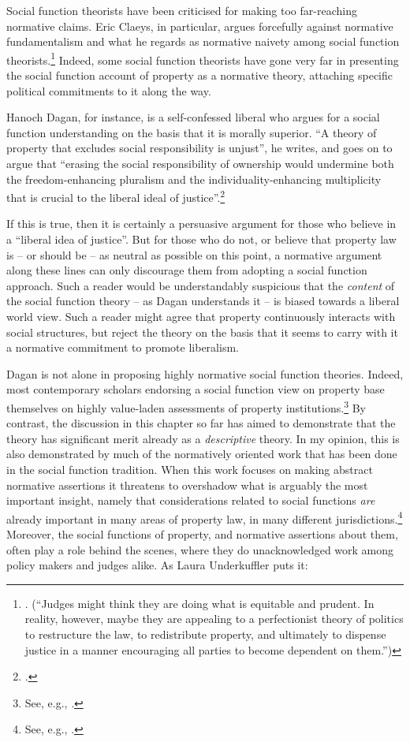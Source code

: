 Social function theorists have been criticised for making too far-reaching normative claims. Eric Claeys, in particular, argues forcefully against normative fundamentalism and what he regards as normative naivety among social function theorists.\footnote{\cite[945]{claeys09}. (``Judges might think they are doing what is equitable and prudent. In reality, however, maybe they are appealing to a perfectionist theory of politics to restructure the law, to redistribute property, and ultimately to dispense justice in a manner encouraging all parties to become dependent on them.'')} Indeed, some social function theorists have gone very far in presenting the social function account of property as a normative theory, attaching specific political commitments to it along the way.

Hanoch Dagan, for instance, is a self-confessed liberal who argues for a social function understanding on the basis that it is morally superior. ``A theory of property that excludes social responsibility is unjust'', he writes, and goes on to argue that ``erasing the social responsibility of ownership would undermine both the freedom-enhancing pluralism and the individuality-enhancing multiplicity that is crucial to the liberal ideal of justice''.\footcite[1259]{dagan07}

If this is true, then it is certainly a persuasive argument for those who believe in a ``liberal idea of justice''. But for those who do not, or believe that property law is -- or should be -- as neutral as possible on this point, a normative argument along these lines can only discourage them from adopting a social function approach. Such a reader would be understandably suspicious that the {\it content} of the social function theory -- as Dagan understands it -- is biased towards a liberal world view. Such a reader might agree that property continuously interacts with social structures, but reject the theory on the basis that it seems to carry with it a normative commitment to promote liberalism.

Dagan is not alone in proposing highly normative social function theories. Indeed, most contemporary scholars endorsing a social function view on property base themselves on highly value-laden assessments of property institutions.\footnote{See, e.g.,  \cite{alexander09,crawford11,davidson11,singer09,penalver09}.} By contrast, the discussion in this chapter so far has aimed to demonstrate that the theory has significant merit already as a {\it descriptive} theory. In my opinion, this is also demonstrated by much of the normatively oriented work that has been done in the social function tradition. When this work focuses on making abstract normative assertions it threatens to overshadow what is arguably the most important insight, namely that considerations related to social functions {\it are} already important in many areas of property law, in many different jurisdictions.\footnote{See, e.g., \cite{gray94,mirow11,cunha11,bonilla11}.} Moreover, the social functions of property, and normative assertions about them, often play a role behind the scenes, where they do unacknowledged work among policy makers and judges alike. As Laura Underkuffler puts it:

